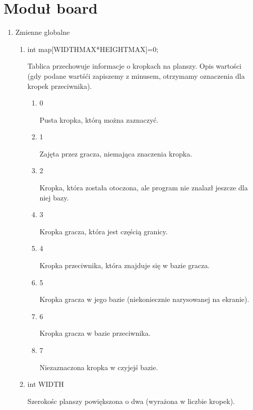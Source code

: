 \documentclass{article}
\begin{document}
\section{Moduł board}

\begin{enumerate}
\item Zmienne globalne

\begin{enumerate}

\item int map[WIDTH\textunderscore MAX*HEIGHT\textunderscore MAX]={0};

Tablica przechowuje informacje o kropkach na planszy. Opis wartości (gdy podane wartśći zapiszemy z minusem, otrzymamy oznaczenia dla kropek przeciwnika).
\begin{enumerate}

\item 0

Pusta kropka, którą można zaznaczyć.

\item 1

Zajęta przez gracza, niemająca znaczenia kropka.

\item 2

Kropka, która została otoczona, ale program nie znalazł jeszcze dla niej bazy.

\item 3

Kropka gracza, która jest częścią granicy.

\item 4

Kropka przeciwnika, która znajduje się w bazie gracza.

\item 5

Kropka gracza w jego bazie (niekoniecznie narysowanej na ekranie).

\item 6

Kropka gracza w bazie przeciwnika.

\item 7

Niezaznaczona kropka w czyjejś bazie.

\end{enumerate}

\item int WIDTH

Szerokośc planszy powiększona o dwa (wyrażona w liczbie kropek).


\end{enumerate}
\end{enumerate}
\end{document}
